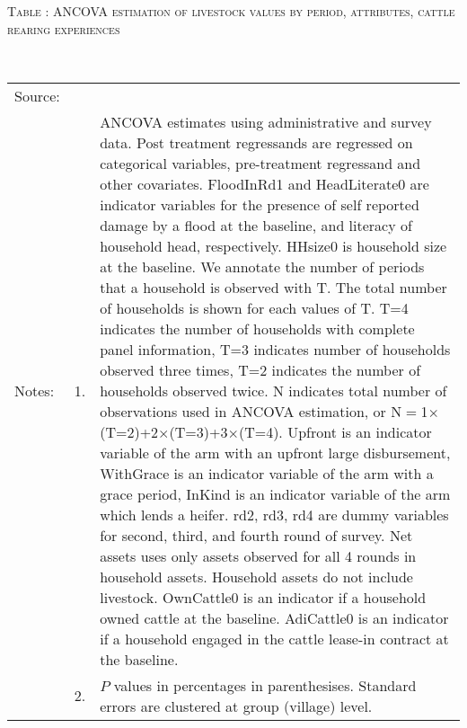 \vspace{0cm}\hspace{-1cm}\begin{minipage}[t]{14cm}
\hfil\textsc{\normalsize Table \thetable: ANCOVA estimation of livestock values by period, attributes, cattle rearing experiences\label{tab ANCOVA Livestock Experience attributes timevarying 1}}\\
\setlength{\tabcolsep}{1pt}
\setlength{\baselineskip}{8pt}
\renewcommand{\arraystretch}{.52}
\hfil{}\\
\renewcommand{\arraystretch}{.8}
\setlength{\tabcolsep}{1pt}
\begin{tabular}{>{\hfill\scriptsize}p{1cm}<{}>{\hfill\scriptsize}p{.25cm}<{}>{\scriptsize}p{12cm}<{\hfill}}
Source:& \multicolumn{2}{l}{\scriptsize Estimated with GUK administrative and survey data.}\\
Notes: & 1. & ANCOVA estimates using administrative and survey data. Post treatment regressands are regressed on categorical variables, pre-treatment regressand and other covariates. \textsf{FloodInRd1} and \textsf{HeadLiterate0} are indicator variables for the presence of self reported damage by a flood at the baseline, and literacy of household head, respectively. \textsf{HHsize0} is household size at the baseline. We annotate the number of periods that a household is observed with \textsf{T}. The total number of households is shown for each values of \textsf{T}. \textsf{T=4} indicates the number of households with complete panel information, \textsf{T=3} indicates number of households observed three times, \textsf{T=2} indicates the number of households observed twice. \textsf{N} indicates total number of observations used in ANCOVA estimation, or \textsf{N$=$1$\times$(T=2)+2$\times$(T=3)+3$\times$(T=4)}.  \textsf{Upfront} is an indicator variable of the arm with an upfront large disbursement, \textsf{WithGrace} is an indicator variable of the arm with a grace period, \textsf{InKind} is an indicator variable of the arm which lends a heifer. \textsf{rd2, rd3, rd4} are dummy variables for second, third, and fourth round of survey. Net assets uses only assets observed for all 4 rounds in household assets. Household assets do not include livestock. \textsf{OwnCattle0} is an indicator if a household owned cattle at the baseline. \textsf{AdiCattle0} is an indicator if a household engaged in the cattle lease-in contract at the baseline.  \\
& 2. & $P$ values in percentages in parenthesises. Standard errors are clustered at group (village) level.
\end{tabular}
\end{minipage}



